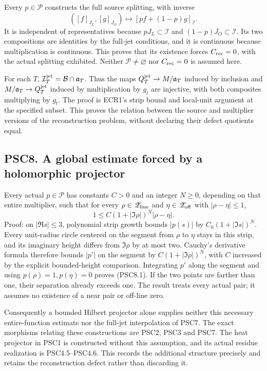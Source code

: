 Every \(p\in\mathscr P\) constructs the full source splitting, with
inverse \[
([f]_{J_L},[g]_{J_O})\longmapsto[pf+(1-p)g]_{\mathcal I}.
\tag{PSC7.2}
\] It is independent of representatives because
\(pJ_L\subset\mathcal I\) and \((1-p)J_O\subset\mathcal I\). Its two
compositions are identities by the full-jet conditions, and it is
continuous because multiplication is continuous. This proves that its
existence forces \(C_{\rm rec}=0\), with the actual splitting exhibited.
Neither \(\mathscr P\ne\varnothing\) nor \(C_{\rm rec}=0\) is assumed
here.

For each \(T\), \(\mathcal I_T^{\rm jet}=\mathcal B\cap\mathfrak a_T\).
Thus the maps \(Q_T^{\rm jet}\to M/\mathfrak a_T\) induced by inclusion
and \(M/\mathfrak a_T\to Q_T^{\rm jet}\) induced by multiplication by
\(g_t\) are injective, with both composites multiplying by \(g_t\). The
proof is ECR1's strip bound and local-unit argument at the specified
subset. This proves the relation between the source and multiplier
versions of the reconstruction problem, without declaring their defect
quotients equal.

\subsection{PSC8. A global estimate forced by a holomorphic
projector}\label{psc8.-a-global-estimate-forced-by-a-holomorphic-projector}

Every actual \(p\in\mathscr P\) has constants \(C>0\) and an integer
\(N\ge0\), depending on that entire multiplier, such that for every
\(\rho\in\mathscr Z_{\rm line}\) and \(\eta\in\mathscr Z_{\rm off}\)
with \(|\rho-\eta|\le1\), \[
1\le C(1+|\Im\rho|)^N|\rho-\eta|.
\tag{PSC8.1}
\] Proof: on \(|\Re s|\le3\), polynomial strip growth bounds \(|p(s)|\)
by \(C_0(1+|\Im s|)^N\). Every unit-radius circle centered on the
segment from \(\rho\) to \(\eta\) stays in this strip, and its imaginary
height differs from \(\Im\rho\) by at most two. Cauchy's derivative
formula therefore bounds \(|p'|\) on the segment by
\(C(1+|\Im\rho|)^N\), with \(C\) increased by the explicit
bounded-height comparison. Integrating \(p'\) along the segment and
using \(p(\rho)=1,p(\eta)=0\) proves (PSC8.1). If the two points are
farther than one, their separation already exceeds one. The result
treats every actual pair; it assumes no existence of a near pair or
off-line zero.

Consequently a bounded Hilbert projector alone supplies neither this
necessary entire-function estimate nor the full-jet interpolation of
PSC7. The exact morphisms relating these constructions are PSC2, PSC3
and PSC7. The heat projector in PSC1 is constructed without this
assumption, and its actual residue realization is PSC4.5--PSC4.6. This
records the additional structure precisely and retains the
reconstruction defect rather than discarding it.

